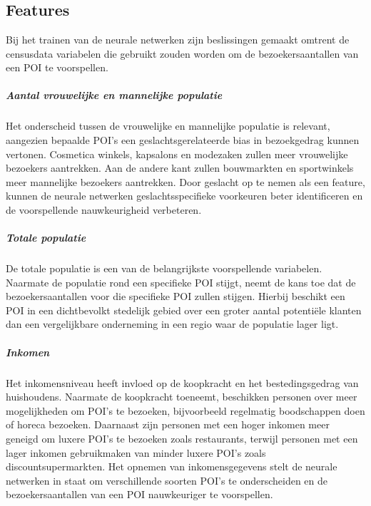 \chapter{}%
\label{ch:proof-of-concept}

\section{Features}
Bij het trainen van de neurale netwerken zijn beslissingen gemaakt omtrent de censusdata variabelen die gebruikt zouden worden om de bezoekersaantallen van een POI  te voorspellen.

\paragraph{Aantal vrouwelijke en mannelijke populatie}
Het onderscheid tussen de vrouwelijke en mannelijke populatie is relevant, aangezien bepaalde POI’s een geslachtsgerelateerde bias in bezoekgedrag kunnen vertonen. Cosmetica winkels, kapsalons en modezaken zullen meer vrouwelijke bezoekers aantrekken. Aan de andere kant zullen bouwmarkten en sportwinkels meer mannelijke bezoekers aantrekken. Door geslacht op te nemen als een feature, kunnen de neurale netwerken geslachtsspecifieke voorkeuren beter identificeren en de voorspellende nauwkeurigheid verbeteren.

\paragraph{Totale populatie}
De totale populatie is een van de belangrijkste voorspellende variabelen. Naarmate de populatie rond een specifieke POI stijgt, neemt de kans toe dat de bezoekersaantallen voor die specifieke POI zullen stijgen. Hierbij beschikt een POI in een dichtbevolkt stedelijk gebied over een groter aantal potentiële klanten dan een vergelijkbare onderneming in een regio waar de populatie lager ligt. 

\paragraph{Inkomen}
Het inkomensniveau heeft invloed op de koopkracht en het bestedingsgedrag van huishoudens. Naarmate de koopkracht toeneemt, beschikken personen over meer mogelijkheden om POI's te bezoeken, bijvoorbeeld regelmatig boodschappen doen of horeca bezoeken. Daarnaast zijn personen met een hoger inkomen meer geneigd om luxere POI’s te bezoeken zoals restaurants, terwijl personen met een lager inkomen gebruikmaken van minder luxere POI’s zoals discountsupermarkten. Het opnemen van inkomensgegevens stelt de neurale netwerken in staat om verschillende soorten POI’s te onderscheiden en de bezoekersaantallen van een POI nauwkeuriger te voorspellen.

